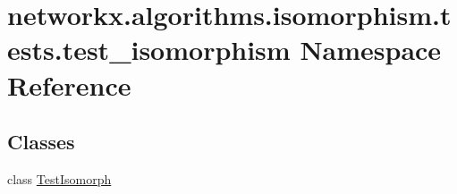 \hypertarget{namespacenetworkx_1_1algorithms_1_1isomorphism_1_1tests_1_1test__isomorphism}{}\section{networkx.\+algorithms.\+isomorphism.\+tests.\+test\+\_\+isomorphism Namespace Reference}
\label{namespacenetworkx_1_1algorithms_1_1isomorphism_1_1tests_1_1test__isomorphism}
\subsection*{Classes}
\begin{DoxyCompactItemize}
\item 
class \hyperlink{classnetworkx_1_1algorithms_1_1isomorphism_1_1tests_1_1test__isomorphism_1_1TestIsomorph}{Test\+Isomorph}
\end{DoxyCompactItemize}
